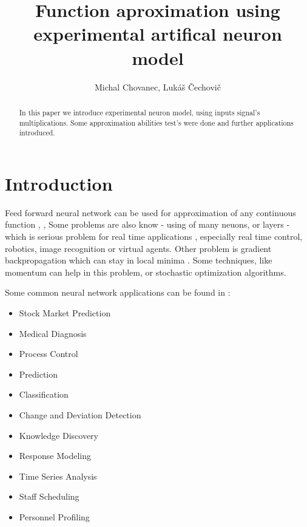 \documentclass[times]{cpeauth}
\begin{document}

\title{Function aproximation using experimental artifical neuron model}

\author{Michal Chovanec, Lukáš Čechovič \\}

\address{Faculty of management of science and informatics, Žilinská Univerzita, SK}


\begin{abstract}
In this paper we introduce experimental neuron model,
using inputs signal's multiplications. Some approximation abilities test's were done
and further applications introduced.
\end{abstract}


\maketitle


\vspace{-6pt}

\section{Introduction}
\vspace{-2pt}


Feed forward neural network can be used for approximation of any continuous function \cite{bib:Approximation_1}, \cite{bib:Approximation_2}, \cite{bib:Approximation_3}
Some problems are also know \cite{bib:Approximation_problem_1} - using of many neuons, or layers -
which is serious problem for real time applications \cite{bib:Approximation_problem_2}, especially
real time control, robotics, image recognition or virtual agents. Other problem is gradient backpropagation
which can stay in local minima \cite{bib:Backpopagation_01}. Some techniques, like momentum can help in this problem,
or stochastic optimization algorithms.

Some common neural network applications \cite{bib:NN_Applications_01} can be found in :

\begin{itemize}
  \item Stock Market Prediction
  \item Medical Diagnosis
  \item Process Control
  \item Prediction
  \item Classification
  \item Change and Deviation Detection
  \item Knowledge Discovery
  \item Response Modeling
  \item Time Series Analysis
  \item Staff Scheduling
  \item Personnel Profiling
\end{itemize}
\end{document}
